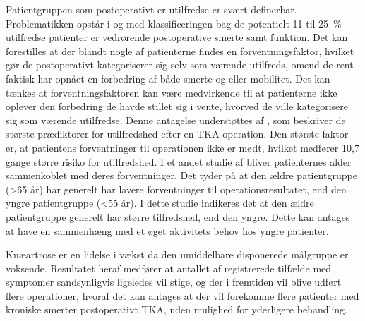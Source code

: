 Patientgruppen som postoperativt er utilfredse er svært definerbar. Problematikken opstår i og med klassificeringen bag de potentielt 11 til 25~\% utilfredse patienter er vedrørende postoperative smerte samt funktion. Det kan forestilles at der blandt nogle af patienterne findes en forventningsfaktor, hvilket gør de postoperativt kategoriserer sig selv som værende utilfreds, omend de rent faktisk har opnået en forbedring af både smerte og eller mobilitet. Det kan tænkes at forventningsfaktoren kan være medvirkende til at patienterne ikke oplever den forbedring de havde stillet sig i vente, hvorved de ville kategorisere sig som værende utilfredse. Denne antagelse understøttes af \cite{Bourne2010}, som beskriver de største prædiktorer for utilfredshed efter en TKA-operation. Den største faktor er, at patientens forventninger til operationen ikke er mødt, hvilket medfører 10,7 gange større risiko for utilfredshed. \citep{Bourne2010} I et andet studie af \cite{Keudell2013} bliver patienternes alder sammenkoblet med deres forventninger. Det tyder på at den ældre patientgruppe (>65 år) har generelt har lavere forventninger til operationsresultatet, end den yngre patientgruppe (<55 år). I dette studie indikeres det at den ældre patientgruppe generelt har større tilfredshed, end den yngre.\cite{Bourne2010} Dette kan antages at have en sammenhæng med et øget aktivitets behov hos yngre patienter. 


Knæartrose er en lidelse i vækst da den umiddelbare disponerede målgruppe er voksende. Resultatet heraf medfører at antallet af registrerede tilfælde med symptomer sandsynligvis ligeledes vil stige, og der i fremtiden vil blive udført flere operationer, hvoraf det kan antages at der vil forekomme flere patienter med kroniske smerter postoperativt TKA, uden mulighed for yderligere behandling.

